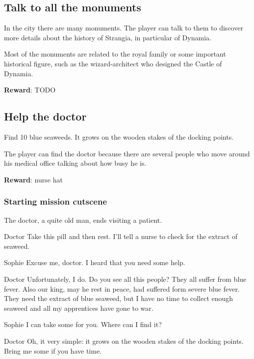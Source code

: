 \subsection{Talk to all the monuments}
In the city there are many monuments. The player can talk to them to discover more details about the history of Strangia, in particular of Dynamia.

Most of the monuments are related to the royal family or some important historical figure, such as the wizard-architect who designed the Castle of Dynamia.

\textbf{Reward}: TODO


\subsection{Help the doctor}
Find 10 blue seaweeds. It grows on the wooden stakes of the docking points.

The player can find the doctor because there are several people who move around his medical office talking about how busy he is.

\textbf{Reward}: nurse hat

\subsubsection*{Starting mission cutscene}
\begin{screenplay}

The doctor, a quite old man, ends visiting a patient.

\begin{dialogue}{Doctor}
Take this pill and then rest. I'll tell a nurse to check for the extract of seaweed.
\end{dialogue}

\begin{dialogue}{Sophie}
Excuse me, doctor. I heard that you need some help.
\end{dialogue}

\begin{dialogue}{Doctor}
Unfortunately, I do. Do you see all this people? They all suffer from blue fever. Also our king, may he rest in peace, had suffered form severe blue fever. They need the extract of blue seaweed, but I have no time to collect enough seaweed and all my apprentices have gone to war.
\end{dialogue}

\begin{dialogue}{Sophie}
I can take some for you. Where can I find it?
\end{dialogue}

\begin{dialogue}{Doctor}
Oh, it very simple: it grows on the wooden stakes of the docking points. Bring me some if you have time.
\end{dialogue}

\end{screenplay}

